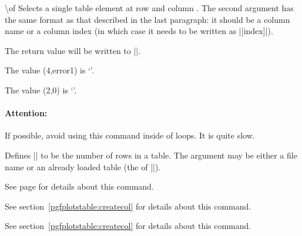\begin{command}{\pgfplotstablegetelem{}\textbackslash of}
	Selects a single table element at row  and column . The second argument has the same format as that described in the last paragraph: it should be a column name or a column index (in which case it needs to be written as |[index]|).

	The return value will be written to |\pgfplotsretval|.
\begin{codeexample}[]
\of{\table}
The value (4,error1) is `\pgfplotsretval'. 

\of{\table}
The value (2,0) is `\pgfplotsretval'.
\end{codeexample}

	\paragraph{Attention:} If possible, avoid using this command inside of loops. It is quite slow.
\end{command}

\begin{command}{\pgfplotstablegetrowsof{}}
	Defines |\pgfmathresult| to be the number of rows in a table. The argument may be either a file name or an already loaded table (the  of |\pgfplotstableread|).
\end{command}


\begin{command}{\pgfplotstablevertcat{}}
	See page \pageref{table:vertcat} for details about this command.
\end{command}

\begin{command}{\pgfplotstablenew{}}
	See section~\ref{pgfplotstable:createcol} for details about this command.
\end{command}
\begin{command}{\pgfplotstablecreatecol{}}
	See section~\ref{pgfplotstable:createcol} for details about this command.
\end{command}
	
